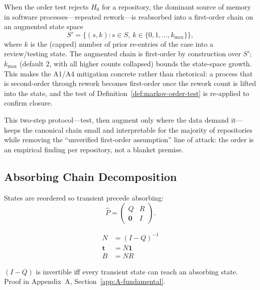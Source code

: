 \begin{definition}
\label{def:state-augmentation}
When the order test rejects $H_0$ for a repository, the dominant source of
memory in software processes---repeated rework---is reabsorbed into a
first-order chain on an augmented state space
\begin{equation}
\label{eq:augmented-state}
S' = \{(s, k) : s \in S,\ k \in \{0, 1, \ldots, k_{\max}\}\},
\end{equation}
where $k$ is the (capped) number of prior re-entries of the case into a
review/testing state. The augmented chain is first-order by construction over
$S'$; $k_{\max}$ (default $2$, with all higher counts collapsed) bounds the
state-space growth. This makes the A1/A4 mitigation concrete rather than
rhetorical: a process that is second-order through rework becomes first-order
once the rework count is lifted into the state, and the test of
Definition~\ref{def:markov-order-test} is re-applied to confirm closure.
\end{definition}

This two-step protocol---test, then augment only where the data demand
it---keeps the canonical chain small and interpretable for the majority of
repositories while removing the ``unverified first-order assumption'' line of
attack: the order is an empirical finding per repository, not a blanket
premise.


\subsection{Absorbing Chain Decomposition}
\label{sec:s3-absorbing}

States are reordered so transient precede absorbing:
\begin{equation}
\label{eq:absorbing-decomposition}
\hat{P} = \begin{pmatrix} Q & R \\ \mathbf{0} & I \end{pmatrix}.
\end{equation}

\begin{align}
N &= (I - Q)^{-1} \label{eq:fundamental-computation} \\
\mathbf{t} &= N \mathbf{1} \label{eq:expected-steps} \\
B &= N R \label{eq:absorption-prob}
\end{align}

\begin{property}[Invertibility]
\label{prop:invertibility}
$(I - Q)$ is invertible iff every transient state can reach an absorbing
state. Proof in Appendix~A, Section~\ref{app:A-fundamental}.
\end{property}

